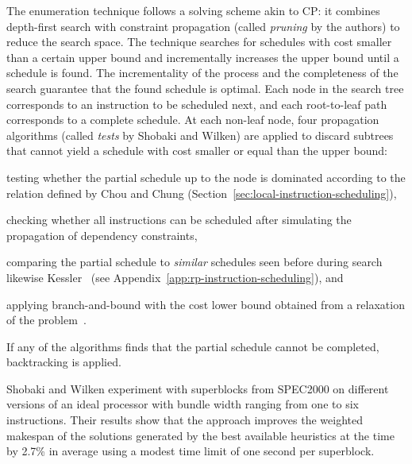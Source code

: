 \documentclass[acmsmall,authorversion,nonacm]{acmart}
\begin{document}
The enumeration technique follows a solving scheme akin to CP: it
combines depth-first search with constraint propagation (called
\emph{pruning} by the authors) to reduce the search space.
The technique searches for schedules with cost smaller than a certain
upper bound and incrementally increases the upper bound until a
schedule is found.
The incrementality of the process and the completeness of the search
guarantee that the found schedule is optimal.
Each node in the search tree corresponds to an instruction to be
scheduled next, and each root-to-leaf path corresponds to a complete
schedule.
At each non-leaf node, four propagation algorithms (called
\emph{tests} by Shobaki and Wilken) are applied to discard subtrees
that cannot yield a schedule with cost smaller or equal than the upper
bound:
\begin{inparaitem}[]
\item testing whether the partial schedule up to the node is dominated
  according to the relation defined by Chou and Chung
  (Section~\ref{sec:local-instruction-scheduling}),
\item checking whether all instructions can be scheduled after
  simulating the propagation of dependency constraints,
\item comparing the partial schedule to \emph{similar} schedules seen
  before during search likewise Kessler~\cite{Kessler1998}
  (see Appendix~\ref{app:rp-instruction-scheduling}), and
\item applying branch-and-bound with the cost lower bound obtained
  from a relaxation of the problem~\cite{Rim1994,Langevin1996}.
\end{inparaitem}
If any of the algorithms finds that the partial schedule cannot be
completed, backtracking is applied.

Shobaki and Wilken experiment with superblocks from SPEC2000 on
different versions of an ideal processor with bundle width ranging
from one to six instructions.
Their results show that the approach improves the weighted makespan of
the solutions generated by the best available heuristics at the time
by 2.7\% in average using a modest time limit of one second per
superblock.
\end{document}

